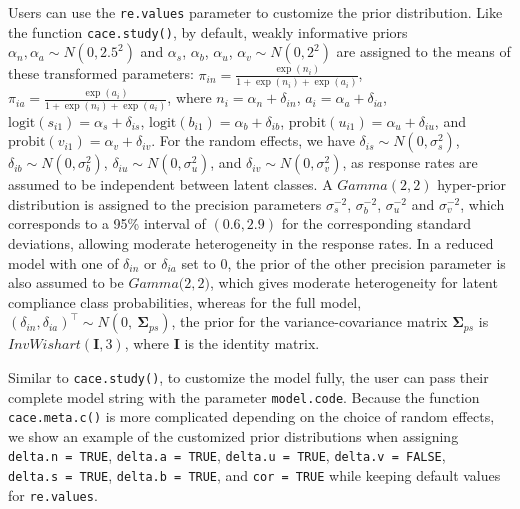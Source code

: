 Users can use the \texttt{re.values} parameter to customize the prior distribution. Like the function \texttt{cace.study()}, by default, weakly informative priors \({\alpha}_{n}, {\alpha}_{a} \sim N(0, 2.5^2)\) and \(\alpha_s\), \(\alpha_b\), \(\alpha_u\), \(\alpha_v \sim N(0, 2^2)\) are assigned to the means of these transformed parameters: \(\pi_{in}=\frac{\exp(n_i)}{1+\exp(n_i)+\exp(a_i)}\), \(\pi_{ia}=\frac{\exp(a_i)}{1+\exp(n_i)+\exp(a_i)}\), where \(n_i={\alpha}_{n}+{\delta}_{in}\), \(a_i={\alpha}_{a}+{\delta}_{ia}\), \(\text{logit}(s_{i1})=\alpha_s + \delta_{is}\),
\(\text{logit}(b_{i1})=\alpha_b + \delta_{ib}\), \(\text{probit}(u_{i1})=\alpha_u + \delta_{iu}\), and \(\text{probit}(v_{i1})=\alpha_v + \delta_{iv}\).
For the random effects, we have \({\delta}_{is} \sim N(0,{\sigma}^2_{s})\),
\({\delta}_{ib} \sim N(0,{\sigma}^2_{b})\),
\({\delta}_{iu} \sim N(0,{\sigma}^2_{u})\), and
\({\delta}_{iv} \sim N(0,{\sigma}^2_{v})\),
as response rates are assumed to be independent between latent classes.
A \(Gamma(2, 2)\) hyper-prior distribution is assigned to the precision parameters \({\sigma}^{-2}_s\), \({\sigma}^{-2}_b\), \({\sigma}^{-2}_u\) and \({\sigma}^{-2}_v\), which corresponds to a 95\% interval of \((0.6, 2.9)\) for the corresponding standard deviations, allowing moderate heterogeneity in the response rates. In a reduced model with one of \(\delta_{in}\) or \(\delta_{ia}\) set to 0, the prior of the other precision parameter is also assumed to be \(Gamma\mathrm(2, 2)\), which gives moderate heterogeneity for latent compliance class probabilities, whereas for the full model, \({(\delta_{in}, \delta_{ia})}^\top \sim N(0, \ {\mathbf{\Sigma}}_{ps})\),
the prior for the variance-covariance matrix \({\mathbf{\Sigma}}_{ps}\) is \(InvWishart(\mathbf{I}, 3)\), where \(\mathbf{I}\) is the identity matrix.

Similar to \texttt{cace.study()}, to customize the model fully, the user can pass their complete model string with the parameter \texttt{model.code}. Because the function \texttt{cace.meta.c()} is more complicated depending on the choice of random effects, we show an example of the customized prior distributions when assigning \texttt{delta.n\ =\ TRUE}, \texttt{delta.a\ =\ TRUE}, \texttt{delta.u\ =\ TRUE}, \texttt{delta.v\ =\ FALSE}, \texttt{delta.s\ =\ TRUE}, \texttt{delta.b\ =\ TRUE}, and \texttt{cor\ =\ TRUE} while keeping default values for \texttt{re.values}.

